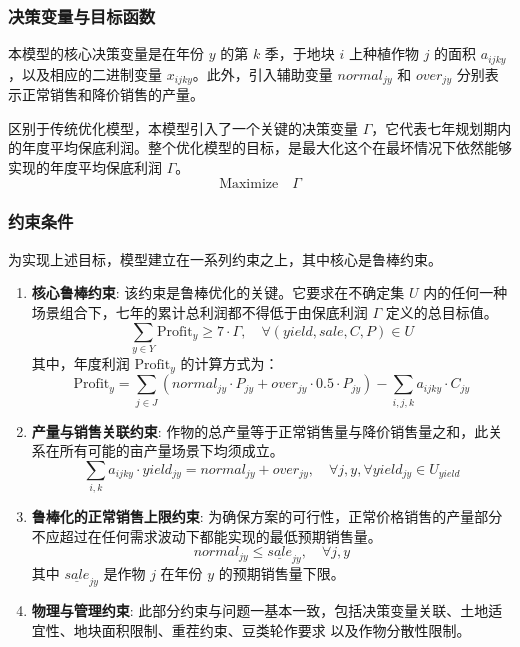 \subsubsection{决策变量与目标函数}
本模型的核心决策变量是在年份 $y$ 的第 $k$ 季，于地块 $i$ 上种植作物 $j$ 的面积 $a_{ijky}$，以及相应的二进制变量 $x_{ijky}$。此外，引入辅助变量 $normal_{jy}$ 和 $over_{jy}$ 分别表示正常销售和降价销售的产量。

区别于传统优化模型，本模型引入了一个关键的决策变量 $\Gamma$，它代表七年规划期内的年度平均保底利润。整个优化模型的目标，是最大化这个在最坏情况下依然能够实现的年度平均保底利润 $\Gamma$。
\begin{equation}
	\text{Maximize} \quad \Gamma \label{eq:objective}
\end{equation}

\subsubsection{约束条件}
为实现上述目标，模型建立在一系列约束之上，其中核心是鲁棒约束。
\begin{enumerate}
	\item \textbf{核心鲁棒约束}: 该约束是鲁棒优化的关键。它要求在不确定集 $U$ 内的任何一种场景组合下，七年的累计总利润都不得低于由保底利润 $\Gamma$ 定义的总目标值。
	      \begin{equation}
		      \sum_{y \in Y} \text{Profit}_y \ge 7 \cdot \Gamma, \quad \forall (yield, sale, C, P) \in U \label{eq:robust_core}
	      \end{equation}
	      其中，年度利润 $\text{Profit}_y$ 的计算方式为：
	      \begin{equation}
		      \text{Profit}_y = \sum_{j \in J} (normal_{jy} \cdot P_{jy} + over_{jy} \cdot 0.5 \cdot P_{jy}) - \sum_{i,j,k} a_{ijky} \cdot C_{jy} \label{eq:profit_calc}
	      \end{equation}

	\item \textbf{产量与销售关联约束}: 作物的总产量等于正常销售量与降价销售量之和，此关系在所有可能的亩产量场景下均须成立。
	      \begin{equation}
		      \sum_{i,k} a_{ijky} \cdot yield_{jy} = normal_{jy} + over_{jy}, \quad \forall j, y, \forall yield_{jy} \in U_{yield} \label{eq:yield_balance}
	      \end{equation}

	\item \textbf{鲁棒化的正常销售上限约束}: 为确保方案的可行性，正常价格销售的产量部分不应超过在任何需求波动下都能实现的最低预期销售量。
	      \begin{equation}
		      normal_{jy} \le \underline{sale}_{jy}, \quad \forall j,y \label{eq:sale_limit_robust}
	      \end{equation}
	      其中 $\underline{sale}_{jy}$ 是作物 $j$ 在年份 $y$ 的预期销售量下限。

	\item \textbf{物理与管理约束}: 此部分约束与问题一基本一致，包括决策变量关联、土地适宜性、地块面积限制、重茬约束、豆类轮作要求 以及作物分散性限制。
\end{enumerate}

